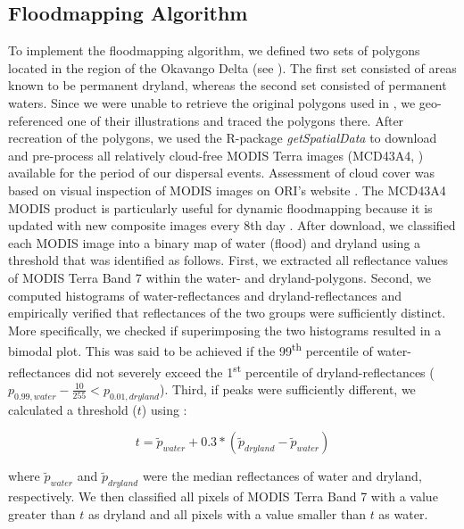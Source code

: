 \documentclass[abstract=on,10pt,a4paper,bibliography=totocnumbered]{scrartcl}
\begin{document}
\subsection{Floodmapping Algorithm}
\label{Appendix:FloodmappingAlgorithm}
To implement the floodmapping algorithm, we defined two sets of polygons located
in the region of the Okavango Delta (see ). The first set
consisted of areas known to be permanent dryland, whereas the second set
consisted of permanent waters. Since we were unable to retrieve the original
polygons used in \cite{Wolski.2017}, we geo-referenced one of their
illustrations and traced the polygons there. After recreation of the polygons,
we used the R-package \textit{getSpatialData} \citep{Schwalb.2018} to download
and pre-process all relatively cloud-free MODIS Terra images (MCD43A4,
\cite{Schaaf.2015}) available for the period of our dispersal events. Assessment
of cloud cover was based on visual inspection of MODIS images on ORI's website
\citep{ORI.2019}. The MCD43A4 MODIS product is particularly useful for dynamic
floodmapping because it is updated with new composite images every 8th day
\citep{Wolski.2017}. After download, we classified each MODIS image into a
binary map of water (flood) and dryland using a threshold that was identified as
follows. First, we extracted all reflectance values of MODIS Terra Band 7 within
the water- and dryland-polygons. Second, we computed histograms of
water-reflectances and dryland-reflectances and empirically verified that
reflectances of the two groups were sufficiently distinct. More specifically, we
checked if superimposing the two histograms resulted in a bimodal plot. This was
said to be achieved if the 99\textsuperscript{th} percentile of
water-reflectances did not severely exceed the 1\textsuperscript{st} percentile
of dryland-reflectances (\(p_{0.99, water} - \frac{10}{255} < p_{0.01,
dryland}\)). Third, if peaks were sufficiently different, we calculated a
threshold (\(t\)) using :

\begin{equation}
\label{EQ1}
t = \widetilde{p}_{water} + 0.3 * (\widetilde{p}_{dryland} -
\widetilde{p}_{water})
\end{equation}

\noindent where \(\widetilde{p}_{water}\) and \(\widetilde{p}_{dryland}\) were
the median reflectances of water and dryland, respectively. We then classified
all pixels of MODIS Terra Band 7 with a value greater than \(t\) as dryland and
all pixels with a value smaller than \(t\) as water.
\end{document}
